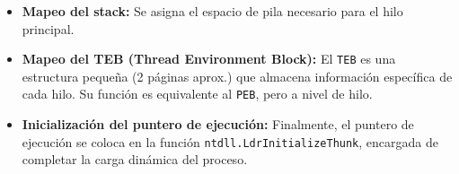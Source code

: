 \begin{itemize}[leftmargin=1.5cm]
    \item \textbf{Mapeo del stack:} Se asigna el espacio de pila necesario para el hilo
    principal.
    \item \textbf{Mapeo del TEB (Thread Environment Block):} El \texttt{TEB} es una
    estructura pequeña (2 páginas aprox.) que almacena información específica de cada hilo.
    Su función es equivalente al \texttt{PEB}, pero a nivel de hilo.
    \item \textbf{Inicialización del puntero de ejecución:} Finalmente, el puntero de
    ejecución se coloca en la función \texttt{ntdll.LdrInitializeThunk}, encargada de
    completar la carga dinámica del proceso.
\end{itemize}
